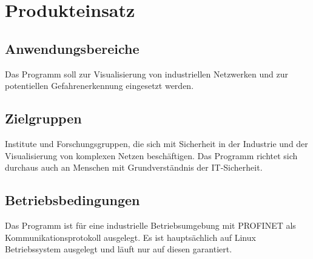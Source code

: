 \chapter{Produkteinsatz}

\section{Anwendungsbereiche}
Das Programm soll zur Visualisierung von industriellen Netzwerken und zur potentiellen Gefahrenerkennung eingesetzt werden.

\section{Zielgruppen}
Institute und Forschungsgruppen, die sich mit Sicherheit in der Industrie und der Visualisierung von komplexen Netzen beschäftigen. Das Programm richtet sich durchaus auch an Menschen mit Grundverständnis der IT-Sicherheit.

\section{Betriebsbedingungen}
Das Programm ist für eine industrielle Betriebsumgebung mit PROFINET als Kommunikationsprotokoll ausgelegt. Es ist hauptsächlich auf Linux Betriebssystem ausgelegt und läuft nur auf diesen garantiert. 
